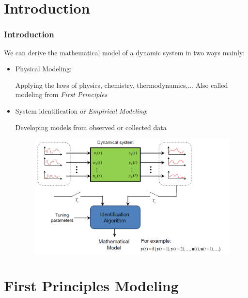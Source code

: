 \section{Introduction}
\begin{frame}
	\frametitle{Introduction}
	We can derive the mathematical model of a dynamic system in two ways mainly:
	\begin{itemize}
		\item Physical Modeling: 
		
		Applying the laws of physics, chemistry, thermodynamics,...
		Also called modeling from \emph{First Principles}
		
		\pause 
		
		\item  System identification or \emph{Empirical Modeling}:
		
		Developing models from observed or collected data
		\begin{figure}
			\centering
			\includegraphics[width=0.7\linewidth]{img/system-identification}
			\label{fig:system-identification}
		\end{figure}
		
	\end{itemize}
\end{frame}


\section{First Principles Modeling}



